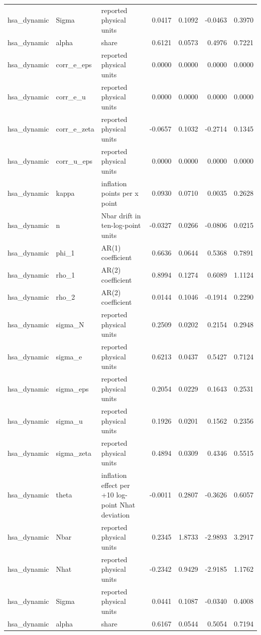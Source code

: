 \begin{tabular}{lllrrrr}
hsa\_dynamic & Sigma & reported physical units & 0.0417 & 0.1092 & -0.0463 & 0.3970 \\
hsa\_dynamic & alpha & share & 0.6121 & 0.0573 & 0.4976 & 0.7221 \\
hsa\_dynamic & corr\_e\_eps & reported physical units & 0.0000 & 0.0000 & 0.0000 & 0.0000 \\
hsa\_dynamic & corr\_e\_u & reported physical units & 0.0000 & 0.0000 & 0.0000 & 0.0000 \\
hsa\_dynamic & corr\_e\_zeta & reported physical units & -0.0657 & 0.1032 & -0.2714 & 0.1345 \\
hsa\_dynamic & corr\_u\_eps & reported physical units & 0.0000 & 0.0000 & 0.0000 & 0.0000 \\
hsa\_dynamic & kappa & inflation points per x point & 0.0930 & 0.0710 & 0.0035 & 0.2628 \\
hsa\_dynamic & n & Nbar drift in ten-log-point units & -0.0327 & 0.0266 & -0.0806 & 0.0215 \\
hsa\_dynamic & phi\_1 & AR(1) coefficient & 0.6636 & 0.0644 & 0.5368 & 0.7891 \\
hsa\_dynamic & rho\_1 & AR(2) coefficient & 0.8994 & 0.1274 & 0.6089 & 1.1124 \\
hsa\_dynamic & rho\_2 & AR(2) coefficient & 0.0144 & 0.1046 & -0.1914 & 0.2290 \\
hsa\_dynamic & sigma\_N & reported physical units & 0.2509 & 0.0202 & 0.2154 & 0.2948 \\
hsa\_dynamic & sigma\_e & reported physical units & 0.6213 & 0.0437 & 0.5427 & 0.7124 \\
hsa\_dynamic & sigma\_eps & reported physical units & 0.2054 & 0.0229 & 0.1643 & 0.2531 \\
hsa\_dynamic & sigma\_u & reported physical units & 0.1926 & 0.0201 & 0.1562 & 0.2356 \\
hsa\_dynamic & sigma\_zeta & reported physical units & 0.4894 & 0.0309 & 0.4346 & 0.5515 \\
hsa\_dynamic & theta & inflation effect per +10 log-point Nhat deviation & -0.0011 & 0.2807 & -0.3626 & 0.6057 \\
hsa\_dynamic & Nbar & reported physical units & 0.2345 & 1.8733 & -2.9893 & 3.2917 \\
hsa\_dynamic & Nhat & reported physical units & -0.2342 & 0.9429 & -2.9185 & 1.1762 \\
hsa\_dynamic & Sigma & reported physical units & 0.0441 & 0.1087 & -0.0340 & 0.4008 \\
hsa\_dynamic & alpha & share & 0.6167 & 0.0544 & 0.5054 & 0.7194 \\

\end{tabular}
